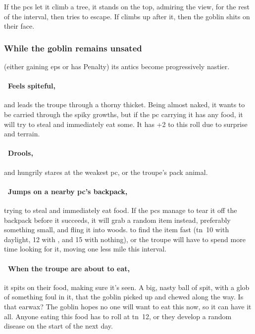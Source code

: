 \documentclass[10pt,twoside]{book}
\begin{document}
If the \glspl{pc} let it climb a tree, it stands on the top, admiring the view, for the rest of the \gls{interval}, then tries to escape.
If  climbs up after it, then the goblin shits on their face.

\subsubsection{While the goblin remains unsated}
(either gaining \glspl{ep} or has  Penalty)
its antics become progressively nastier.

\paragraph{\Square~Feels spiteful,}
and leads the troupe through a thorny thicket.%
Being almost naked, it wants to be carried through the spiky growths, but if the \gls{pc} carrying it has any food, it will try to steal and immediately eat some.
It has +2 to this roll due to surprise and terrain.


\paragraph{\Square~Drools,}
and hungrily stares at the weakest \gls{pc}, or the troupe's pack animal.

\paragraph{\Square~Jumps on a nearby \gls{pc}'s backpack,}
trying to steal and immediately eat food.
If the \glspl{pc} manage to tear it off the backpack before it succeeds, it will grab a random item instead, preferably something small, and fling it into woods.
 to find the item fast (\gls{tn}~10 with daylight, 12 with , and 15 with nothing), or the troupe will have to spend more time looking for it, moving one less mile this \gls{interval}.

\paragraph{\Square~When the troupe are about to eat,}
it spits on their food, making sure it's seen.
A big, nasty ball of spit, with a glob of something foul in it, that the goblin picked up and chewed along the way.
Is that earwax?
The goblin hopes no one will want to eat this now, so it can have it all.
Anyone eating this food has to roll  at \gls{tn}~12, or they develop a random disease%
on the start of the next day.
\end{document}
